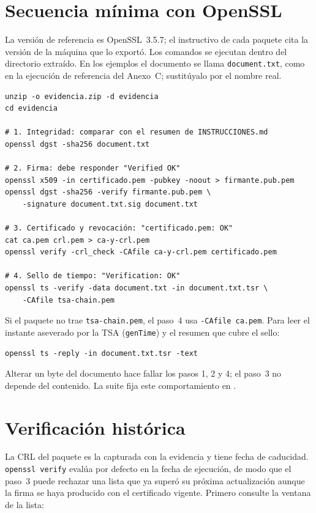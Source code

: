 \section{Secuencia mínima con OpenSSL}\label{sec:ver-openssl}

La versión de referencia es OpenSSL~3.5.7; el instructivo de cada paquete
cita la versión de la máquina que lo exportó. Los comandos se ejecutan
dentro del directorio extraído. En los ejemplos el documento se llama
\texttt{document.txt}, como en la ejecución de referencia del Anexo~C;
sustitúyalo por el nombre real.

\begin{verbatim}
unzip -o evidencia.zip -d evidencia
cd evidencia

# 1. Integridad: comparar con el resumen de INSTRUCCIONES.md
openssl dgst -sha256 document.txt

# 2. Firma: debe responder "Verified OK"
openssl x509 -in certificado.pem -pubkey -noout > firmante.pub.pem
openssl dgst -sha256 -verify firmante.pub.pem \
    -signature document.txt.sig document.txt

# 3. Certificado y revocación: "certificado.pem: OK"
cat ca.pem crl.pem > ca-y-crl.pem
openssl verify -crl_check -CAfile ca-y-crl.pem certificado.pem

# 4. Sello de tiempo: "Verification: OK"
openssl ts -verify -data document.txt -in document.txt.tsr \
    -CAfile tsa-chain.pem
\end{verbatim}

Si el paquete no trae \texttt{tsa-chain.pem}, el paso~4 usa
\texttt{-CAfile ca.pem}. Para leer el instante aseverado por la TSA
(\texttt{genTime}) y el resumen que cubre el sello:

\begin{verbatim}
openssl ts -reply -in document.txt.tsr -text
\end{verbatim}

Alterar un byte del documento hace fallar los pasos 1, 2 y 4; el paso~3 no
depende del contenido. La suite fija este comportamiento en
\archivo{crates/bin/tests/package_cli.rs}.

\section{Verificación histórica}\label{sec:ver-historica}

La CRL del paquete es la capturada con la evidencia y tiene fecha de
caducidad. \texttt{openssl verify} evalúa por defecto en la fecha de
ejecución, de modo que el paso~3 puede rechazar una lista que ya superó
su próxima actualización aunque la firma se haya producido con el
certificado vigente. Primero consulte la ventana de la lista:

